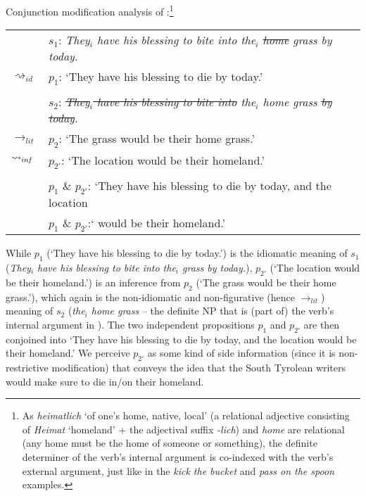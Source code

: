 \documentclass[output=paper]{langsci/langscibook}
\begin{document}
\ea \label{analysis1 home grass} 
Conjunction modification analysis of :\footnote{As \textit{heimatlich} `of one's home, native, local' (a relational adjective consisting of \textit{Heimat} `homeland' + the adjectival suffix \mbox{\textit{-lich}}) and \textit{home} are relational (any home must be the home of someone or something), the definite determiner of the verb's internal argument is co-indexed with the verb's external argument, just like in the \textit{kick the bucket} and \textit{pass on the spoon} examples.} \\
\vspace{5pt}
\begin{tabular}{ll}
								& 	$s_{1}$: \hspace{4pt} \textit{They$_{i}$ have his blessing to bite into the$_{i}$ \sout{home} grass by today.} \\
$\rightsquigarrow_{id}$				&	$p_{1}$: \hspace{1pt} `They have his blessing to die by today.' \\
\vspace{-5pt} \\
								& 	$s_{2}$: \hspace{4pt} \textit{\sout{They$_{i}$ have his blessing to bite into} the$_{i}$ home grass \sout{by today}.} \\
$\rightarrow_{lit}$					&	$p_{2}$: \hspace{1pt} `The grass would be their home grass.' \\
$\rightsquigarrow_{in\hspace{-0.8pt} f}$	&	$p_{2'}$: \hspace{-1.5pt} `The location would be their homeland.' \\
\vspace{-5pt} \\
								&	$p_{1}$ \& $p_{2'}$: `They have his blessing to die by today, and the location \\
								&	{\white $p_{1}$ \& $p_{2'}$:`} would be their homeland.' 
\end{tabular}
\z

\noindent While $p_{1}$ (`They have his blessing to die by today.') is the idiomatic meaning of $s_{1}$ (\textit{They$_{i}$ have his blessing to bite into the$_{i}$ grass by today.}), $p_{2'}$ (`The location would be their homeland.') is an inference from $p_{2}$ (`The grass would be their home grass.'), which again is the non-idiomatic and non-figurative (hence $\rightarrow_{lit}$) meaning of $s_{2}$ (\textit{the$_{i}$ home grass} -- the definite NP that is (part of) the verb's internal argument in ). The two independent propositions $p_{1}$ and $p_{2'}$ are then conjoined into `They have his blessing to die by today, and the location would be their homeland.' We perceive $p_{2'}$ as some kind of side information (since it is non-restrictive modification) that conveys the idea that the South Tyrolean writers would make sure to die in/on their homeland.
\end{document}

